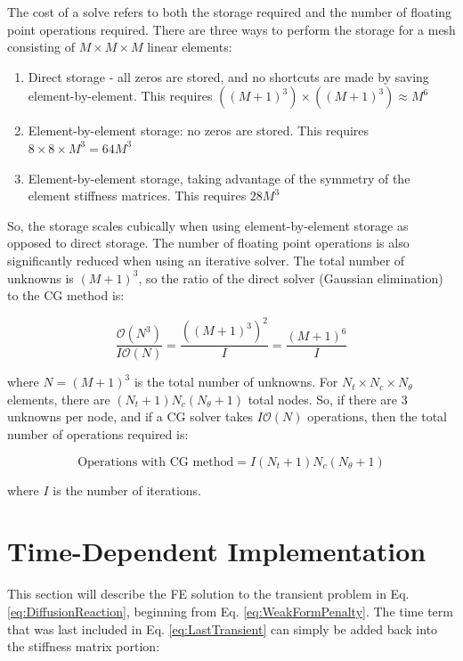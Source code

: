 \documentclass[10pt]{article}
\begin{document}
The cost of a solve refers to both the storage required and the number of floating point operations required. There are three ways to perform the storage for a mesh consisting of \(M\times M\times M\) linear elements:

\begin{enumerate}
\item Direct storage - all zeros are stored, and no shortcuts are made by saving element-by-element. This requires \(((M+1)^3)\times((M+1)^3)\approx M^6\)
\item Element-by-element storage: no zeros are stored. This requires \(8\times8\times M^3=64M^3\)
\item Element-by-element storage, taking advantage of the symmetry of the element stiffness matrices. This requires \(28M^3\)
\end{enumerate} 

So, the storage scales cubically when using element-by-element storage as opposed to direct storage. The number of floating point operations is also significantly reduced when using an iterative solver. The total number of unknowns is \((M+1)^3\), so the ratio of the direct solver (Gaussian elimination) to the CG method is:

\begin{equation}
\frac{\mathscr{O}(N^3)}{I\mathscr{O}(N)}=\frac{\left((M+1)^3\right)^2}{I}=\frac{(M+1)^6}{I}
\end{equation}

where \(N=(M+1)^3\) is the total number of unknowns. For \(N_t\times N_c\times N_\theta\) elements, there are \((N_t+1)N_c(N_\theta+1)\) total nodes. So, if there are 3 unknowns per node, and if a CG solver takes \(I\mathscr{O}(N)\) operations, then the total number of operations required is:

\begin{equation}
\text{Operations with CG method}=I(N_t+1)N_c(N_\theta+1)
\end{equation}
 
 where \(I\) is the number of iterations.
 
 \section{Time-Dependent Implementation}
 
 This section will describe the FE solution to the transient problem in Eq. \eqref{eq:DiffusionReaction}, beginning from Eq. \eqref{eq:WeakFormPenalty}. The time term that was last included in Eq. \eqref{eq:LastTransient} can simply be added back into the stiffness matrix portion:
 
\end{document}
